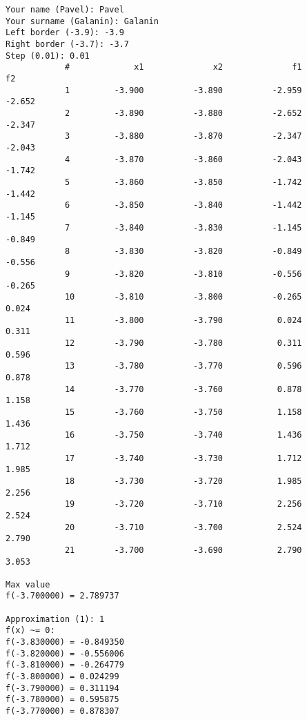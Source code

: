 \begin{lstlisting}[language=Out,]
Your name (Pavel): Pavel
Your surname (Galanin): Galanin
Left border (-3.9): -3.9
Right border (-3.7): -3.7
Step (0.01): 0.01
            #	          x1	          x2	          f1	          f2
            1	      -3.900	      -3.890	      -2.959	      -2.652
            2	      -3.890	      -3.880	      -2.652	      -2.347
            3	      -3.880	      -3.870	      -2.347	      -2.043
            4	      -3.870	      -3.860	      -2.043	      -1.742
            5	      -3.860	      -3.850	      -1.742	      -1.442
            6	      -3.850	      -3.840	      -1.442	      -1.145
            7	      -3.840	      -3.830	      -1.145	      -0.849
            8	      -3.830	      -3.820	      -0.849	      -0.556
            9	      -3.820	      -3.810	      -0.556	      -0.265
            10	      -3.810	      -3.800	      -0.265	       0.024
            11	      -3.800	      -3.790	       0.024	       0.311
            12	      -3.790	      -3.780	       0.311	       0.596
            13	      -3.780	      -3.770	       0.596	       0.878
            14	      -3.770	      -3.760	       0.878	       1.158
            15	      -3.760	      -3.750	       1.158	       1.436
            16	      -3.750	      -3.740	       1.436	       1.712
            17	      -3.740	      -3.730	       1.712	       1.985
            18	      -3.730	      -3.720	       1.985	       2.256
            19	      -3.720	      -3.710	       2.256	       2.524
            20	      -3.710	      -3.700	       2.524	       2.790
            21	      -3.700	      -3.690	       2.790	       3.053

Max value
f(-3.700000) = 2.789737

Approximation (1): 1
f(x) ~= 0:
f(-3.830000) = -0.849350
f(-3.820000) = -0.556006
f(-3.810000) = -0.264779
f(-3.800000) = 0.024299
f(-3.790000) = 0.311194
f(-3.780000) = 0.595875
f(-3.770000) = 0.878307
\end{lstlisting}